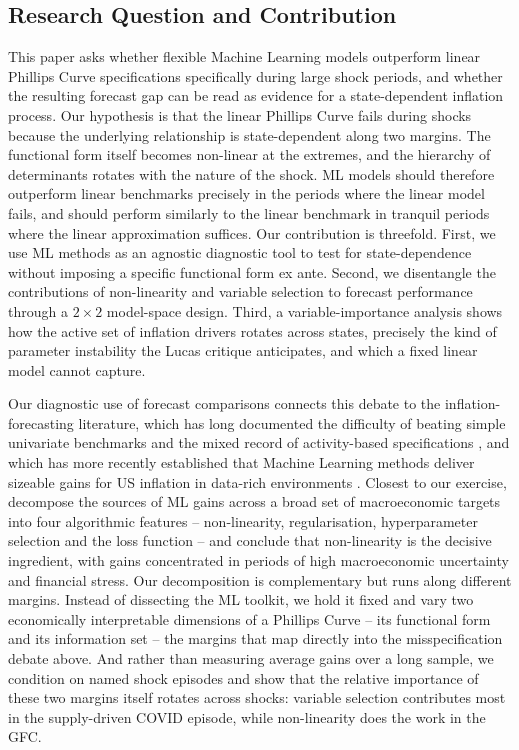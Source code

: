 \documentclass[12pt,a4paper]{article}
\begin{document}
\subsection{Research Question and Contribution}
\label{subsec:synthesis}
This paper asks whether flexible Machine Learning models outperform linear Phillips Curve specifications specifically during large shock periods, and whether the resulting forecast gap can be read as evidence for a state-dependent inflation process. Our hypothesis is that the linear Phillips Curve fails during shocks because the underlying relationship is state-dependent along two margins. The functional form itself becomes non-linear at the extremes, and the hierarchy of determinants rotates with the nature of the shock. ML models should therefore outperform linear benchmarks precisely in the periods where the linear model fails, and should perform similarly to the linear benchmark in tranquil periods where the linear approximation suffices. Our contribution is threefold. First, we use ML methods as an agnostic diagnostic tool to test for state-dependence without imposing a specific functional form ex ante. Second, we disentangle the contributions of non-linearity and variable selection to forecast performance through a $2\times2$ model-space design. Third, a variable-importance analysis shows how the active set of inflation drivers rotates across states, precisely the kind of parameter instability the Lucas critique anticipates, and which a fixed linear model cannot capture.

Our diagnostic use of forecast comparisons connects this debate to the inflation-forecasting literature, which has long documented the difficulty of beating simple univariate benchmarks \citep{atkesonohanian2001,stockwatson2007} and the mixed record of activity-based specifications \citep{stockwatson1999,faust2013}, and which has more recently established that Machine Learning methods deliver sizeable gains for US inflation in data-rich environments \citep{medeiros2021veiga,hauzenberger2023}. Closest to our exercise, \citet{coulombe2022ml} decompose the sources of ML gains across a broad set of macroeconomic targets into four algorithmic features -- non-linearity, regularisation, hyperparameter selection and the loss function -- and conclude that non-linearity is the decisive ingredient, with gains concentrated in periods of high macroeconomic uncertainty and financial stress. Our decomposition is complementary but runs along different margins. Instead of dissecting the ML toolkit, we hold it fixed and vary two economically interpretable dimensions of a Phillips Curve -- its functional form and its information set -- the margins that map directly into the misspecification debate above. And rather than measuring average gains over a long sample, we condition on named shock episodes and show that the relative importance of these two margins itself rotates across shocks: variable selection contributes most in the supply-driven COVID episode, while non-linearity does the work in the GFC.
\end{document}
